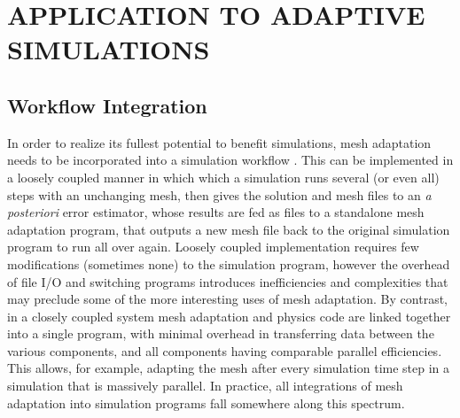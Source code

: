 
\chapter{APPLICATION TO ADAPTIVE SIMULATIONS}
\label{chap:apps}
\nocite{ibanez2016pumi}
\nocite{ibanez2017modifiable}

\section{Workflow Integration}

In order to realize its fullest potential to benefit
simulations, mesh adaptation needs to be incorporated
into a simulation workflow \cite{smith2016building}.
This can be implemented in a loosely coupled manner in which
which a simulation runs several (or even all) steps with
an unchanging mesh, then gives the solution and mesh
files to an {\it a posteriori} error estimator, whose results
are fed as files to a standalone mesh adaptation program, that
outputs a new mesh file back to the original simulation program
to run all over again.
Loosely coupled implementation
requires few modifications (sometimes none) to the simulation program,
however the overhead of file I/O and switching programs introduces
inefficiencies and complexities that may preclude some of the more
interesting uses of mesh adaptation.
By contrast, in a closely coupled system mesh adaptation
and physics code are linked together into a single program,
with minimal overhead in transferring data between the various
components, and all components having comparable parallel efficiencies.
This allows, for example, adapting the mesh after every simulation
time step in a simulation that is massively parallel.
In practice, all integrations of mesh adaptation into simulation programs
fall somewhere along this spectrum.

